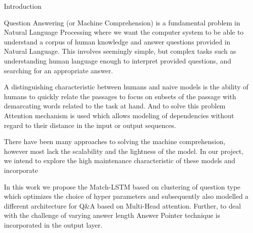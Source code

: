 \documentclass{article}
\begin{document}
\makeheader


\begin{psection}{Introduction}

	\sloppy
	Question Answering (or Machine Comprehension) is a fundamental problem in Natural Language Processing where we want the computer system to be able to understand a corpus of human knowledge and answer questions provided in Natural Language.
	This involves seemingly simple, but complex tasks such as understanding human language enough to interpret provided questions, and searching for an appropriate answer.

	A distinguishing characteristic between humans and naive models is the ability of humans to quickly relate the passages to focus on subsets of the passage with demarcating words related to the task at hand.
	And to solve this problem Attention mechanism is used which allows modeling of dependencies without regard to their distance in the input or output sequences.

	There have been many approaches to solving the machine comprehension, however most lack the scalability and the lightness of the model. In our project, we intend to explore the high maintenance characteristic of these models and incorporate

	In this work we propose the Match-LSTM based on clustering of question type which optimizes the choice of hyper parameters and subsequently also modelled a different architecture for Q\&A based on Multi-Head attention. Further, to deal with the challenge of varying answer length Answer Pointer technique is incorporated in the output layer.

\end{psection}
\end{document}
